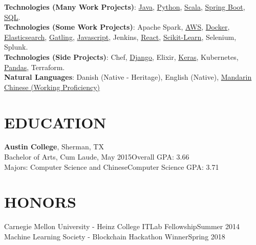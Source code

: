 \documentclass[margin]{res}
\begin{document}
\begin{resume}
\textbf{Technologies (Many Work Projects)}:
\href{https://www.lucaskjaerozhang.com/technology/java/}{Java},
\href{https://www.lucaskjaerozhang.com/technology/python/}{Python},
\href{https://www.lucaskjaerozhang.com/technology/scala/}{Scala},
\href{https://www.lucaskjaerozhang.com/technology/spring-boot/}{Spring Boot},
\href{https://www.lucaskjaerozhang.com/technology/sql/}{SQL}.
\\
\textbf{Technologies (Some Work Projects)}:
Apache Spark,
\href{https://www.lucaskjaerozhang.com/technology/aws/}{AWS},
\href{https://www.lucaskjaerozhang.com/technology/docker/}{Docker},
\href{https://www.lucaskjaerozhang.com/technology/elasticsearch/}{Elasticsearch},
\href{https://www.lucaskjaerozhang.com/technology/gatling/}{Gatling},
\href{https://www.lucaskjaerozhang.com/technology/javascript/}{Javascript},
Jenkins,
\href{https://www.lucaskjaerozhang.com/technology/react/}{React},
\href{https://www.lucaskjaerozhang.com/technology/sklearn/}{Scikit-Learn},
Selenium,
Splunk.
\\
\textbf{Technologies (Side Projects)}:
Chef,
\href{https://www.lucaskjaerozhang.com/technology/django/}{Django},
Elixir,
\href{https://www.lucaskjaerozhang.com/technology/keras/}{Keras},
Kubernetes,
\href{https://www.lucaskjaerozhang.com/technology/pandas/}{Pandas},
Terraform.
\\
\textbf{Natural Languages}: Danish (Native - Heritage), English (Native), \href{https://www.lucaskjaerozhang.com/lucas-kjaero-zhang-%E4%B8%AA%E4%BA%BA%E7%AE%80%E5%8E%86.pdf}{Mandarin Chinese (Working Proficiency)}


\section{EDUCATION}
\textbf{Austin College}, Sherman, TX\\
Bachelor of Arts, Cum Laude, May 2015\hfill Overall GPA:
3.66\\
Majors: Computer Science and Chinese\hfill Computer Science GPA: 3.71\\

\section{HONORS}
Carnegie Mellon University - Heinz College ITLab Fellowship\hfill Summer 2014\\
Machine Learning Society - Blockchain Hackathon Winner\hfill Spring 2018

\end{resume}
\end{document}
